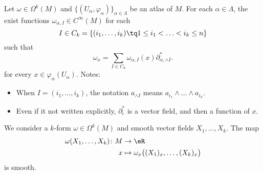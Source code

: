 \begin{proposition}		\label{PROPooNOGKooQedJba}
	Let \( \omega\in \Omega^k(M)\) and \( \{ (U_{\alpha}, \varphi_{\alpha}) \}_{\alpha\in \Lambda}\) be an atlas of \( M\). For each \( \alpha\in \Lambda\), the exist functions \( \omega_{\alpha,I}\in C^{\infty}(M)\) for each
	\begin{equation}
		I\in C_k=\{ (i_1,\ldots,i_k)\tq 1\leq i_1<\ldots <i_k\leq n \}
	\end{equation}
	such that
	\begin{equation}
		\omega_x=\sum_{I\in C_k}\omega_{\alpha, I}(x)\partial^*_{\alpha,\wedge I}.
	\end{equation}
	for every \( x\in \varphi_{\alpha}(U_{\alpha})\).
	Notes:
	\begin{itemize}
		\item
		      When \( I=(i_1,\ldots,i_k)\), the notation \( a_{\wedge I}\) means \( a_{i_1}\wedge \ldots\wedge a_{i_k}\).
		\item
		      Even if it not written explicitly, \( \partial^*_i\) is a vector field, and then a function of \( x\).
	\end{itemize}
\end{proposition}

\noproof


\begin{proposition}			\label{PROPooHTKMooVzYQdW}
	We consider a \( k\)-form \( \omega\in \Omega^k(M)\) and smooth vector fields \( X_1,\ldots,X_k\). The map
	\begin{equation}
		\begin{aligned}
			\omega(X_1,\ldots,X_k)\colon M & \to \eR                                            \\
			x                              & \mapsto \omega_x\big( (X_1)_x,\ldots,(X_k)_x \big)
		\end{aligned}
	\end{equation}
	is smooth.
\end{proposition}

